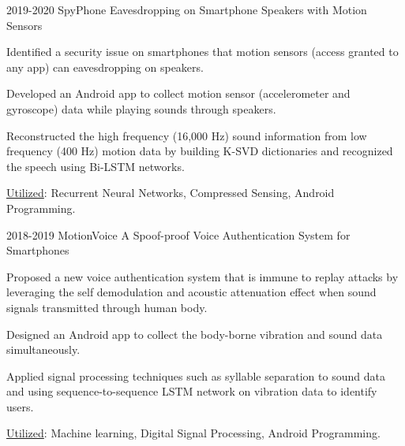 \vspace{-.15in}
\vspace{-.05in}

\begin{cventries}
	
	\cvprojectentry
	{2019-2020 SpyPhone}
	{Eavesdropping on Smartphone Speakers with Motion Sensors}
	{
		\begin{cvitems} %
			\item Identified a security issue on smartphones that motion sensors (access granted to any app) can eavesdropping on speakers.
			\item Developed an Android app to collect motion sensor (accelerometer and gyroscope) data while playing sounds through speakers.
			\item Reconstructed the high frequency (16,000 Hz) sound information from  low frequency (400 Hz) motion data by building K-SVD dictionaries and recognized the speech using Bi-LSTM networks.
			\item  \underline{Utilized}: Recurrent Neural Networks, Compressed Sensing, Android Programming.
		\end{cvitems}
	}
	
	
	\cvprojectentry
	{2018-2019 MotionVoice}
	{A Spoof-proof Voice Authentication System for Smartphones}
	{
		\begin{cvitems} %
			\item Proposed a new voice authentication system that is immune to replay attacks by leveraging the self demodulation and acoustic attenuation effect when sound signals transmitted through human body.
			\item Designed an Android app to collect the body-borne vibration and sound data simultaneously.
			\item Applied signal processing techniques such as syllable separation to sound data and using sequence-to-sequence LSTM network on vibration data to identify users.
			\item  \underline{Utilized}: Machine learning, Digital Signal Processing, Android Programming.
		\end{cvitems}
	}
	

\end{cventries}
